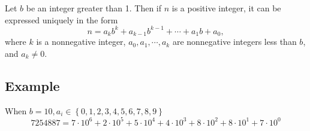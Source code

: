 \documentclass{article}
\begin{document}
Let $ b $ be an integer greater than 1. Then if $ n $ is a positive integer, it can be expressed uniquely in the form
\begin{equation}
	n = a_kb^k + a_{k - 1}b^{k - 1} + \cdots + a_1b + a_0,
\end{equation}
where $ k $ is a nonnegative integer, $ a_0, a_1, \cdots, a_k $ are nonnegative integers less than $ b $, and $ a_k \neq 0 $.

\subsection{Example}

When $ b = 10, a_i \in \left\{ 0, 1, 2, 3, 4, 5, 6, 7, 8, 9 \right\} $
\begin{equation*}
	7254887 = 7 \cdot 10^6 + 2 \cdot 10^5 + 5 \cdot 10^4 + 4 \cdot 10^3 + 8 \cdot 10^2 + 8 \cdot 10^1 + 7 \cdot 10^0
\end{equation*}
\end{document}
